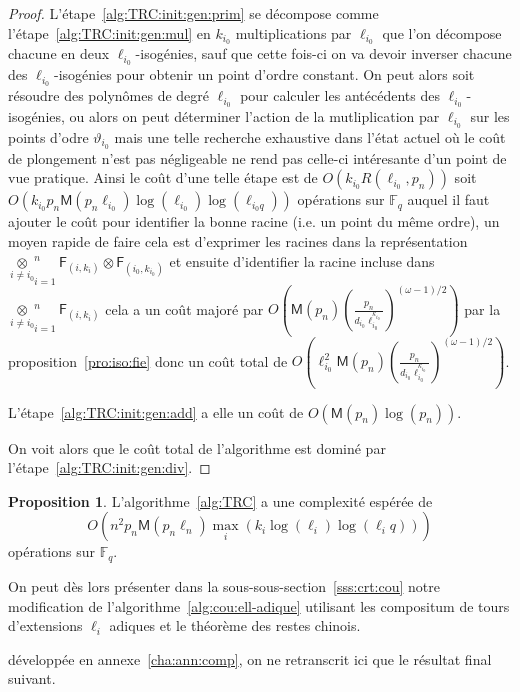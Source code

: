 \documentclass[10pt,a4paper]{book}
\theoremstyle{plain}
\theoremstyle{definition}
\theoremstyle{definition}
\theoremstyle{definition}
\newtheorem{prop}[thm]{Proposition}
\theoremstyle{definition}
\theoremstyle{remark}
\theoremstyle{remark}
\theoremstyle{definition}
\begin{document}
\begin{proof}
L'étape~\ref{alg:TRC:init:gen:prim} se décompose comme 
l'étape~\ref{alg:TRC:init:gen:mul} en $k_{i_0}$ multiplications par 
$\ell_{i_0}$ que l'on décompose chacune en deux $\ell_{i_0}$-isogénies, sauf 
que cette fois-ci on va devoir inverser chacune des $\ell_{i_0}$-isogénies pour
obtenir un point d'ordre constant. On peut alors soit résoudre des polynômes de
degré $\ell_{i_0}$ pour calculer les antécédents des $\ell_{i_0}$-isogénies, ou
alors on peut déterminer l'action de la mutliplication par $\ell_{i_0}$ sur les
points d'odre $\vartheta_{i_0}$ mais une telle recherche exhaustive dans l'état
actuel où le coût de plongement n'est pas négligeable ne rend pas celle-ci 
intéresante d'un point de vue pratique. Ainsi le coût d'une telle étape est de 
$O(k_{i_0}R(\ell_{i_0},p_n))$ soit $O(k_{i_0}p_n\mathsf{M}(p_n\ell_{i_0})
\log(\ell_{i_0})\log(\ell_{i_0q}))$ opérations sur $\mathbb{F}_q$ auquel il 
faut ajouter le coût pour identifier la bonne racine (i.e. un point du même 
ordre), un moyen rapide de faire cela est d'exprimer les racines dans la 
représentation $\underset{i\neq i_0}\otimes_{i=1}^n \mathsf{F}_{(i,k_i)} 
\otimes \mathsf{F}_{(i_0,k_{i_0})}$ et ensuite d'identifier la racine incluse
dans $\underset{i\neq i_0}\otimes_{i=1}^n \mathsf{F}_{(i,k_i)}$ cela a un coût 
majoré par 
$O(\mathsf{M}(p_n)(\frac{p_n}{d_{i_0}\ell_{i_0}^{k_{i_0}}})^{(\omega-1)/2})$ 
par la proposition~\ref{pro:iso:fie} donc un coût total de 
$O(\ell_{i_0}^2\mathsf{M}(p_n)(\frac{p_n}{d_{i_0}\ell_{i_0}^{k_{i_0}}})^{(\omega-1)/2})$.

L'étape~\ref{alg:TRC:init:gen:add} a elle un coût de $O(\mathsf{M}(p_n)\log(p_n))$.

On voit alors que le coût total de l'algorithme est dominé par 
l'étape~\ref{alg:TRC:init:gen:div}.
\end{proof}

\begin{prop}
L'algorithme~\ref{alg:TRC} a une complexité espérée de 
\[
O(n^2 p_{n}\mathsf{M}(p_{n}\ell_{n})\max_i(k_i\log(\ell_{i})\log(\ell_{i}q))) 
\]
opérations sur $\mathbb{F}_q$.
\end{prop}

On peut dès lors présenter dans la sous-sous-section~\ref{sss:crt:cou} notre 
modification de l'algorithme~\ref{alg:cou:ell-adique} utilisant les compositum 
de tours d'extensions $\ell_i$ adiques et le théorème des restes chinois.

développée en 
annexe~\ref{cha:ann:comp}, on ne retranscrit ici que le résultat final suivant.
\end{document}
